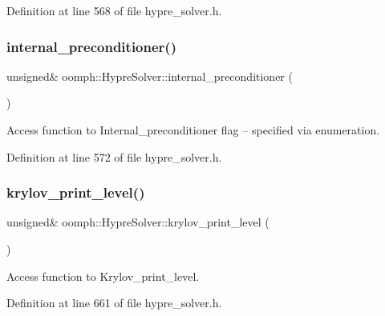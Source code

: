 Definition at line 568 of file hypre\+\_\+solver.\+h.

\mbox{\label{classoomph_1_1HypreSolver_acd4ce0f300c01fe2d9f802e5c0c0876b}} 
\subsubsection{\texorpdfstring{internal\+\_\+preconditioner()}{internal\_preconditioner()}}
{\footnotesize\ttfamily unsigned\& oomph\+::\+Hypre\+Solver\+::internal\+\_\+preconditioner (\begin{DoxyParamCaption}{ }\end{DoxyParamCaption})\hspace{0.3cm}{\ttfamily [inline]}}



Access function to Internal\+\_\+preconditioner flag -- specified via enumeration. 



Definition at line 572 of file hypre\+\_\+solver.\+h.

\mbox{\label{classoomph_1_1HypreSolver_a4ed4bf0114bca132a31b8969c2a8fc00}} 
\subsubsection{\texorpdfstring{krylov\+\_\+print\+\_\+level()}{krylov\_print\_level()}}
{\footnotesize\ttfamily unsigned\& oomph\+::\+Hypre\+Solver\+::krylov\+\_\+print\+\_\+level (\begin{DoxyParamCaption}{ }\end{DoxyParamCaption})\hspace{0.3cm}{\ttfamily [inline]}}



Access function to Krylov\+\_\+print\+\_\+level. 



Definition at line 661 of file hypre\+\_\+solver.\+h.

